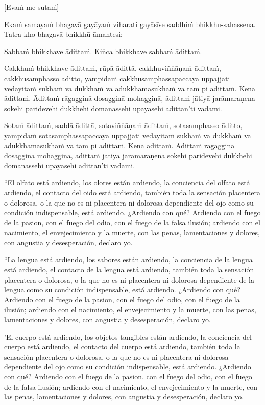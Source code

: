 [Evaṁ me sutaṁ]

Ekaṁ samayaṁ bhagavā gayāyaṁ viharati gayāsīse saddhiṁ bhikkhu-sahassena.
Tatra kho bhagavā bhikkhū āmantesi:

Sabbaṁ bhikkhave ādittaṁ. Kiñca bhikkhave sabbaṁ ādittaṁ.

Cakkhuṁ bhikkhave ādittaṁ, rūpā ādittā, cakkhuviññāṇaṁ ādittaṁ,
cakkhusamphasso āditto, yampidaṁ cakkhusamphassapaccayā uppajjati
vedayitaṁ sukhaṁ vā dukkhaṁ vā adukkhamasukhaṁ vā tam pi ādittaṁ. Kena
ādittaṁ. Ādittaṁ rāgagginā dosagginā mohagginā, ādittaṁ jātiyā
jarāmaraṇena sokehi paridevehi dukkhehi domanassehi upāyāsehi ādittan'ti
vadāmi.

Sotaṁ ādittaṁ, saddā ādittā, sotaviññāṇaṁ ādittaṁ, sotasamphasso āditto,
yampidaṁ sotasamphassapaccayā uppajjati vedayitaṁ sukhaṁ vā dukkhaṁ vā
adukkhamasukhaṁ vā tam pi ādittaṁ. Kena ādittaṁ. Ādittaṁ rāgagginā
dosagginā mohagginā, ādittaṁ jātiyā jarāmaraṇena sokehi paridevehi
dukkhehi domanassehi upāyāsehi ādittan'ti vadāmi.

\clearpage

\englishText
\markboth{\englishTitle}{\rightmark}
“El olfato está ardiendo, los olores están ardiendo, la conciencia del olfato está ardiendo, el contacto del oido está ardiendo, también toda la sensación placentera o dolorosa, o la que no es ni placentera ni dolorosa dependiente del ojo como su condición indispensable, está ardiendo. ¿Ardiendo con qué? Ardiendo con el fuego de la pasion, con el fuego del odio, con el fuego de la falsa ilusión; ardiendo con el nacimiento, el envejecimiento y la muerte, con las penas, lamentaciones y dolores, con angustia y desesperación, declaro yo.

“La lengua está ardiendo, los sabores están ardiendo, la conciencia de la lengua está ardiendo, el contacto de la lengua está ardiendo, también toda la sensación placentera o dolorosa, o la que no es ni placentera ni dolorosa dependiente de la lengua como su condición indispensable, está ardiendo. ¿Ardiendo con qué? Ardiendo con el fuego de la pasion, con el fuego del odio, con el fuego de la ilusión; ardiendo con el nacimiento, el envejecimiento y la muerte, con las penas, lamentaciones y dolores, con angustia y desesperación, declaro yo.


'El cuerpo está ardiendo, los objetos tangibles están ardiendo, la conciencia del cuerpo está ardiendo, el contacto del cuerpo está ardiendo, también toda la sensación placentera o dolorosa, o la que no es ni placentera ni dolorosa dependiente del ojo como su condición indispensable, está ardiendo. ¿Ardiendo con qué? Ardiendo con el fuego de la pasion, con el fuego del odio, con el fuego de la falsa ilusión; ardiendo con el nacimiento, el envejecimiento y la muerte, con las penas, lamentaciones y dolores, con angustia y desesperación, declaro yo.


